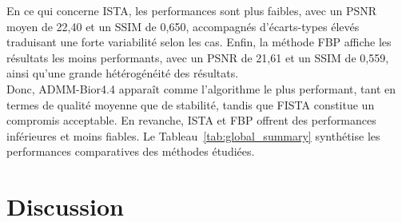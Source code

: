 En ce qui concerne ISTA, les performances sont plus faibles, avec un PSNR moyen de 22,40 et un SSIM de 0,650, accompagnés d'écarts-types élevés traduisant une forte variabilité selon les cas. Enfin, la méthode FBP affiche les résultats les moins performants, avec un PSNR de 21,61 et un SSIM de 0,559, ainsi qu'une grande hétérogénéité des résultats.\\

Donc, ADMM-Bior4.4 apparaît comme l'algorithme le plus performant, tant en termes de qualité moyenne que de stabilité, tandis que FISTA constitue un compromis acceptable. En revanche, ISTA et FBP offrent des performances inférieures et moins fiables. Le Tableau~\ref{tab:global_summary} synthétise les performances comparatives des méthodes étudiées.

\begin{table}[H]
    \centering
    \renewcommand{\arraystretch}{1.1} %
    \caption{Synthèse comparative des performances moyennes sur 19 images}
    \label{tab:global_summary}
\end{table}

\section{Discussion}
